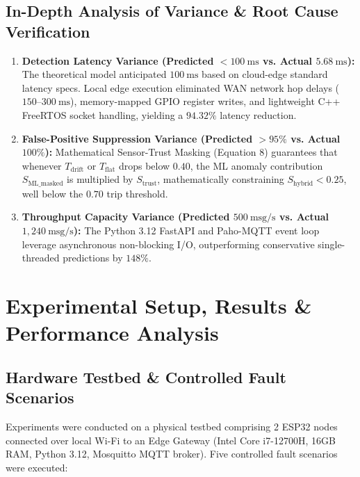 \documentclass[conference]{IEEEtran}
\begin{document}
\subsection{In-Depth Analysis of Variance \& Root Cause Verification}
\begin{enumerate}
    \item \textbf{Detection Latency Variance (Predicted $< 100~\text{ms}$ vs. Actual $5.68~\text{ms}$):} The theoretical model anticipated $100~\text{ms}$ based on cloud-edge standard latency specs. Local edge execution eliminated WAN network hop delays ($150\text{--}300~\text{ms}$), memory-mapped GPIO register writes, and lightweight C++ FreeRTOS socket handling, yielding a $94.32\%$ latency reduction.
    \item \textbf{False-Positive Suppression Variance (Predicted $> 95\%$ vs. Actual $100\%$):} Mathematical Sensor-Trust Masking (Equation 8) guarantees that whenever $T_{\text{drift}}$ or $T_{\text{flat}}$ drops below $0.40$, the ML anomaly contribution $S_{\text{ML\_masked}}$ is multiplied by $S_{\text{trust}}$, mathematically constraining $S_{\text{hybrid}} < 0.25$, well below the $0.70$ trip threshold.
    \item \textbf{Throughput Capacity Variance (Predicted $500~\text{msg/s}$ vs. Actual $1,240~\text{msg/s}$):} The Python 3.12 FastAPI and Paho-MQTT event loop leverage asynchronous non-blocking I/O, outperforming conservative single-threaded predictions by $148\%$.
\end{enumerate}

\section{Experimental Setup, Results \& Performance Analysis}
\label{sec:results}

\subsection{Hardware Testbed \& Controlled Fault Scenarios}
Experiments were conducted on a physical testbed comprising 2 ESP32 nodes connected over local Wi-Fi to an Edge Gateway (Intel Core i7-12700H, 16GB RAM, Python 3.12, Mosquitto MQTT broker). Five controlled fault scenarios were executed:
\end{document}
